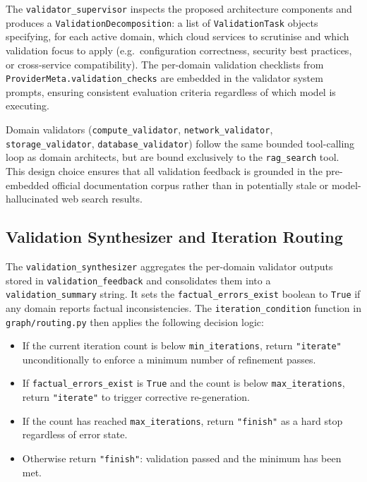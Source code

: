 The \texttt{validator\_supervisor} inspects the proposed architecture components and produces a \texttt{ValidationDecomposition}: a list of \texttt{ValidationTask} objects specifying, for each active domain, which cloud services to scrutinise and which validation focus to apply (e.g.\ configuration correctness, security best practices, or cross-service compatibility). The per-domain validation checklists from \texttt{ProviderMeta.validation\_checks} are embedded in the validator system prompts, ensuring consistent evaluation criteria regardless of which model is executing.

Domain validators (\texttt{compute\_validator}, \texttt{network\_validator}, \texttt{storage\_validator}, \texttt{database\_validator}) follow the same bounded tool-calling loop as domain architects, but are bound exclusively to the \texttt{rag\_search} tool. This design choice ensures that all validation feedback is grounded in the pre-embedded official documentation corpus rather than in potentially stale or model-hallucinated web search results.

\subsection{Validation Synthesizer and Iteration Routing}

The \texttt{validation\_synthesizer} aggregates the per-domain validator outputs stored in \texttt{validation\_feedback} and consolidates them into a \texttt{validation\_summary} string. It sets the \texttt{factual\_errors\_exist} boolean to \texttt{True} if any domain reports factual inconsistencies. The \texttt{iteration\_condition} function in \texttt{graph/routing.py} then applies the following decision logic:

\begin{itemize}
    \item If the current iteration count is below \texttt{min\_iterations}, return \texttt{"iterate"} unconditionally to enforce a minimum number of refinement passes.
    \item If \texttt{factual\_errors\_exist} is \texttt{True} and the count is below \texttt{max\_iterations}, return \texttt{"iterate"} to trigger corrective re-generation.
    \item If the count has reached \texttt{max\_iterations}, return \texttt{"finish"} as a hard stop regardless of error state.
    \item Otherwise return \texttt{"finish"}: validation passed and the minimum has been met.
\end{itemize}


